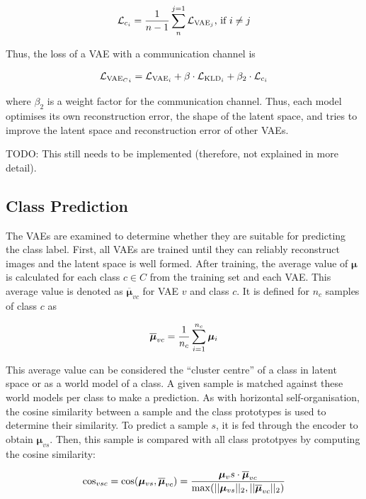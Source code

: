 \begin{align}\eqlbl{hso_9}
	\mathcal{L}_{c_i} = \frac{1}{n-1} \sum_{n}^{j=1} \mathcal{L}_{\text{VAE}_j} \text{, if } i \neq j
\end{align}

Thus, the loss of a VAE with a communication channel is

\begin{align}\eqlbl{hso_10}
		\mathcal{L}_{{\text{VAE}_C}_i} = \mathcal{L}_{\text{VAE}_i} + \beta \cdot \mathcal{L}_{\text{KLD}_i} + \beta_2 \cdot \mathcal{L}_{c_i}
\end{align}

where $\beta_2$ is a weight factor for the communication channel. Thus, each model optimises its own reconstruction error, the shape of the latent space, and tries to improve the latent space and reconstruction error of other VAEs.


TODO: This still needs to be implemented (therefore, not explained in more detail).

\subsection{Class Prediction}
The VAEs are examined to determine whether they are suitable for predicting the class label. First, all VAEs are trained until they can reliably reconstruct images and the latent space is well formed.
After training, the average value of $\boldsymbol{\mu}$ is calculated for each class $c \in C$ from the training set and each VAE. This average value is denoted as $\boldsymbol{\overline{\mu}}_{vc}$ for VAE $v$ and class $c$. It is defined for $n_c$ samples of class $c$ as

\begin{align}\eqlbl{hso_12}
		\boldsymbol{\overline{\mu}}_{vc} = \frac{1}{n_c} \sum_{i=1}^{n_c} \boldsymbol{\mu}_i
\end{align}

This average value can be considered the ``cluster centre'' of a class in latent space or as a world model of a class. A given sample is matched against these world models per class to make a prediction. As with horizontal self-organisation, the cosine similarity between a sample and the class prototypes is used to determine their similarity. To predict a sample $s$, it is fed through the encoder to obtain $\boldsymbol{\mu}_{vs}$. Then, this sample is compared with all class prototpyes by computing the cosine similarity: 

\begin{align}\eqlbl{hso_13}
		\text{cos}_{vsc} = \text{cos}(\boldsymbol{\mu}_{vs}, \boldsymbol{\overline{\mu}}_{vc}) = \frac{\boldsymbol{\mu}_vs \cdot \boldsymbol{\overline{\mu}}_{vc}}{\max(||\boldsymbol{\mu}_{vs}||_2, ||\boldsymbol{\overline{\mu}}_{vc}||_2)}
\end{align}

